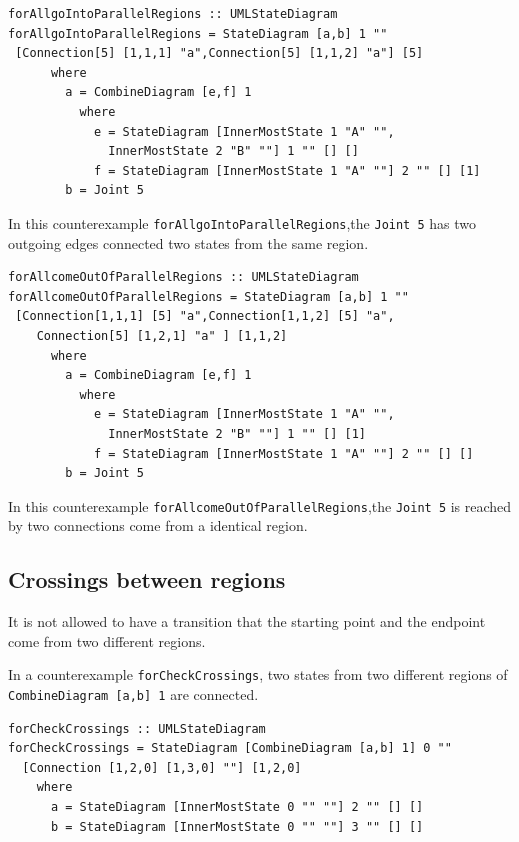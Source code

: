 \begin{verbatim}
forAllgoIntoParallelRegions :: UMLStateDiagram
forAllgoIntoParallelRegions = StateDiagram [a,b] 1 "" 
 [Connection[5] [1,1,1] "a",Connection[5] [1,1,2] "a"] [5]
      where
        a = CombineDiagram [e,f] 1
          where 
            e = StateDiagram [InnerMostState 1 "A" "",
              InnerMostState 2 "B" ""] 1 "" [] []
            f = StateDiagram [InnerMostState 1 "A" ""] 2 "" [] [1]
        b = Joint 5
\end{verbatim}

In this counterexample \verb|forAllgoIntoParallelRegions|,the \verb|Joint 5| has two outgoing edges connected two states from the same region. 

\begin{verbatim}
forAllcomeOutOfParallelRegions :: UMLStateDiagram
forAllcomeOutOfParallelRegions = StateDiagram [a,b] 1 "" 
 [Connection[1,1,1] [5] "a",Connection[1,1,2] [5] "a",
    Connection[5] [1,2,1] "a" ] [1,1,2]
      where
        a = CombineDiagram [e,f] 1
          where 
            e = StateDiagram [InnerMostState 1 "A" "",
              InnerMostState 2 "B" ""] 1 "" [] [1]
            f = StateDiagram [InnerMostState 1 "A" ""] 2 "" [] []
        b = Joint 5
\end{verbatim}

In this counterexample \verb|forAllcomeOutOfParallelRegions|,the \verb|Joint 5| is reached by two connections come from a identical region.




\subsection{Crossings between regions}
\label{sec:representation}
It is not allowed to have a transition that the starting point and the endpoint come from two different regions.

In a counterexample \verb|forCheckCrossings|, two states from two different regions of \verb|CombineDiagram [a,b] 1| are connected.
\begin{verbatim}
forCheckCrossings :: UMLStateDiagram 
forCheckCrossings = StateDiagram [CombineDiagram [a,b] 1] 0 ""
  [Connection [1,2,0] [1,3,0] ""] [1,2,0]
    where
      a = StateDiagram [InnerMostState 0 "" ""] 2 "" [] []
      b = StateDiagram [InnerMostState 0 "" ""] 3 "" [] []
\end{verbatim}


